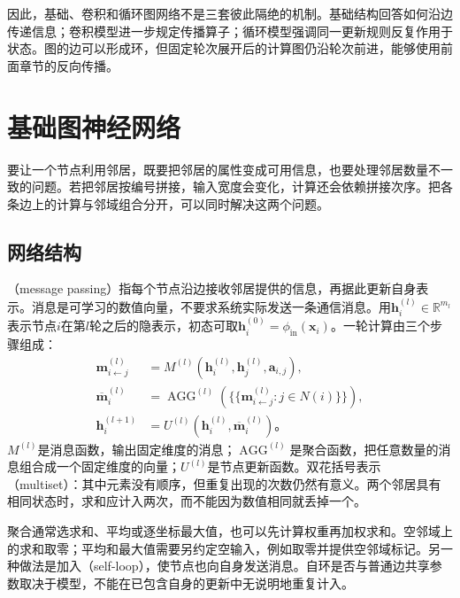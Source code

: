 因此，基础、卷积和循环图网络不是三套彼此隔绝的机制。基础结构回答如何沿边传递信息；卷积模型进一步规定传播算子；循环模型强调同一更新规则反复作用于状态。图的边可以形成环，但固定轮次展开后的计算图仍沿轮次前进，能够使用前面章节的反向传播。

\section{基础图神经网络}
\label{sec:gnn-basic}

要让一个节点利用邻居，既要把邻居的属性变成可用信息，也要处理邻居数量不一致的问题。若把邻居按编号拼接，输入宽度会变化，计算还会依赖拼接次序。把各条边上的计算与邻域组合分开，可以同时解决这两个问题。

\subsection{网络结构}
\label{sec:gnn-structure}

（message passing）指每个节点沿边接收邻居提供的信息，再据此更新自身表示。消息是可学习的数值向量，不要求系统实际发送一条通信消息。用$\bm{h}_i^{(l)}\in\mathbb{R}^{m_l}$表示节点$i$在第$l$轮之后的隐表示，初态可取$\bm{h}_i^{(0)}=\phi_{\mathrm{in}}(\bm{x}_i)$。一轮计算由三个步骤组成：
\begin{equation}
  \begin{aligned}
    \bm{m}_{i\leftarrow j}^{(l)}
      &=M^{(l)}\!\left(\bm{h}_i^{(l)},\bm{h}_j^{(l)},\bm{a}_{i,j}\right),\\
    \overline{\bm{m}}_i^{(l)}
      &=\operatorname{AGG}^{(l)}
        \!\left(\{\!\{\bm{m}_{i\leftarrow j}^{(l)}:j\in N(i)\}\!\}\right),\\
    \bm{h}_i^{(l+1)}
      &=U^{(l)}\!\left(\bm{h}_i^{(l)},\overline{\bm{m}}_i^{(l)}\right)\text{。}
  \end{aligned}
  \label{eq:gnn-message-passing}
\end{equation}
$M^{(l)}$是消息函数，输出固定维度的消息；$\operatorname{AGG}^{(l)}$是聚合函数，把任意数量的消息组合成一个固定维度的向量；$U^{(l)}$是节点更新函数。双花括号表示（multiset）：其中元素没有顺序，但重复出现的次数仍然有意义。两个邻居具有相同状态时，求和应计入两次，而不能因为数值相同就丢掉一个。

聚合通常选求和、平均或逐坐标最大值，也可以先计算权重再加权求和。空邻域上的求和取零；平均和最大值需要另约定空输入，例如取零并提供空邻域标记。另一种做法是加入（self-loop），使节点也向自身发送消息。自环是否与普通边共享参数取决于模型，不能在已包含自身的更新中无说明地重复计入。

